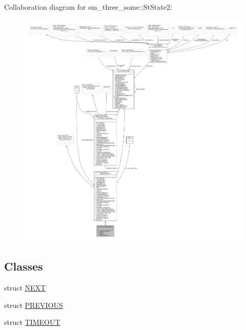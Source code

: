 Collaboration diagram for sm\+\_\+three\+\_\+some\+:\+:St\+State2\+:
\nopagebreak
\begin{figure}[H]
\begin{center}
\leavevmode
\includegraphics[width=350pt]{structsm__three__some_1_1StState2__coll__graph}
\end{center}
\end{figure}
\subsection*{Classes}
\begin{DoxyCompactItemize}
\item 
struct \hyperlink{structsm__three__some_1_1StState2_1_1NEXT}{N\+E\+XT}
\item 
struct \hyperlink{structsm__three__some_1_1StState2_1_1PREVIOUS}{P\+R\+E\+V\+I\+O\+US}
\item 
struct \hyperlink{structsm__three__some_1_1StState2_1_1TIMEOUT}{T\+I\+M\+E\+O\+UT}
\end{DoxyCompactItemize}
